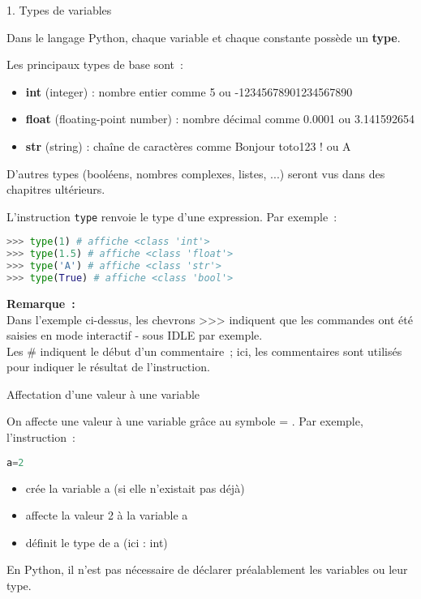 
\begin{h2}1. Types de variables\end{h2}
Dans le langage Python, chaque variable et chaque constante possède un \textbf{type}.
\par
Les principaux types de base sont~:
\begin{itemize}
     \item %
     \textbf{int} (integer) : nombre entier comme 5 ou -12345678901234567890
     \item %
     \textbf{float} (floating-point number) : nombre décimal comme 0.0001 ou 3.141592654
     \item %
     \textbf{str} (string) : chaîne de caractères comme \og Bonjour toto123 ! \fg{} ou \og A \fg{}
\end{itemize}
\par
D'autres types (booléens, nombres complexes, listes, ...) seront vus dans des chapitres ultérieurs.
\par
L'instruction \og \texttt{type} \fg{} renvoie le type d'une expression. Par exemple~:
\begin{lstlisting}[language=Python]
>>> type(1) # affiche <class 'int'>
>>> type(1.5) # affiche <class 'float'>
>>> type('A') # affiche <class 'str'>
>>> type(True) # affiche <class 'bool'>
\end{lstlisting}
\textbf{Remarque~:}\\
Dans l'exemple ci-dessus, les chevrons >>> indiquent que les commandes ont été saisies en mode interactif - sous IDLE par exemple.\\
Les \# indiquent le début d'un commentaire~; ici, les commentaires sont utilisés pour indiquer le résultat de l'instruction.
\begin{h3}Affectation d'une valeur à une variable\end{h3}
On affecte une valeur à une variable grâce au symbole \og = \fg{}. Par exemple, l'instruction~:
\begin{lstlisting}[language=Python]
a=2
\end{lstlisting}
\begin{itemize}
     \item %
     crée la variable a (si elle n'existait pas déjà)
     \item %
     affecte la valeur 2 à la variable a
     \item %
     définit le type de a (ici : int)
\end{itemize}
En Python, il n'est pas nécessaire de déclarer préalablement les variables ou leur type. \\
